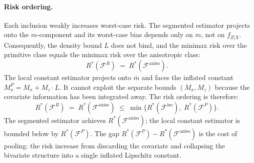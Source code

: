 \paragraph{Risk ordering.}
Each inclusion weakly increases worst-case risk.
The segmented estimator projects onto the $m$-component and its worst-case bias depends only on $m$, not on $f_{Z|X}$.
Consequently, the density bound $L$ does not bind, and the minimax risk over the primitive class equals the minimax risk over the anisotropic class:
\begin{equation*}
	R^*(\mathcal{F}^R) \;=\; R^*(\mathcal{F}^{\mathrm{aniso}}).
\end{equation*}
The local constant estimator projects onto $\bar{m}$ and faces the inflated constant $M_x^P = M_x + M_z \cdot L$.
It cannot exploit the separate bounds $(M_x, M_z)$ because the covariate information has been integrated away.
The risk ordering is therefore:
\begin{equation*}
	R^*(\mathcal{F}^R) \;=\; R^*(\mathcal{F}^{\mathrm{aniso}}) \;\leq\; \min\bigl\{ R^*(\mathcal{F}^{\mathrm{iso}}),\; R^*(\mathcal{F}^P) \bigr\}.
\end{equation*}
The segmented estimator achieves $R^*(\mathcal{F}^{\mathrm{aniso}})$; the local constant estimator is bounded below by $R^*(\mathcal{F}^P)$.
The gap $R^*(\mathcal{F}^P) - R^*(\mathcal{F}^{\mathrm{aniso}})$ is the cost of pooling: the risk increase from discarding the covariate and collapsing the bivariate structure into a single inflated Lipschitz constant.
